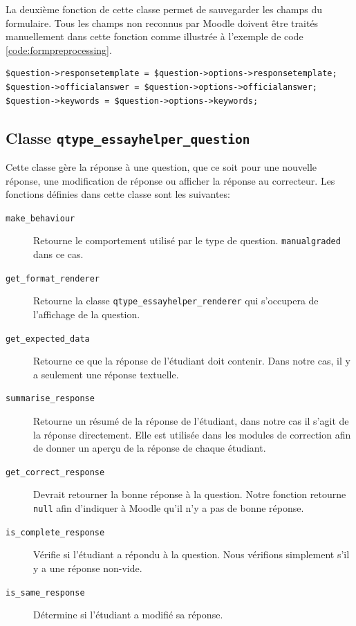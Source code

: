 La deuxi\`eme fonction de cette classe permet de sauvegarder les champs du formulaire.
Tous les champs non reconnus par Moodle doivent \^etre trait\'es manuellement dans cette fonction comme illustr\'ee \`a l'exemple de code \ref{code:formpreprocessing}.
\begin{lstfloat}
\begin{lstlisting}[frame=l]
$question->responsetemplate = $question->options->responsetemplate;
$question->officialanswer = $question->options->officialanswer;
$question->keywords = $question->options->keywords;
\end{lstlisting}
\caption{Extrait du code de la fonction \texttt{data\_preprocessing} de la classe \texttt{qtype\_essayhelper\_edit\_form}.}
\label{code:formpreprocessing}
\end{lstfloat}

\subsection*{Classe \texttt{qtype\_essayhelper\_question}}
Cette classe g\`ere la r\'eponse \`a une question, que ce soit pour une nouvelle r\'eponse, une modification de r\'eponse ou afficher la r\'eponse au correcteur.
Les fonctions d\'efinies dans cette classe sont les suivantes:
\begin{description}
  \item[\texttt{make\_behaviour}] Retourne le comportement utilis\'e par le type de question. \texttt{manualgraded} dans ce cas.
  \item[\texttt{get\_format\_renderer}] Retourne la classe \texttt{qtype\_essayhelper\_renderer} qui s'occupera de l'affichage de la question.
  \item[\texttt{get\_expected\_data}] Retourne ce que la r\'eponse de l'\'etudiant doit contenir. Dans notre cas, il y a seulement une r\'eponse textuelle.
  \item[\texttt{summarise\_response}] Retourne un r\'esum\'e de la r\'eponse de l'\'etudiant, dans notre cas il s'agit de la r\'eponse directement. Elle est utilis\'ee dans les modules de correction afin de donner un aper\c{c}u de la r\'eponse de chaque \'etudiant.
  \item[\texttt{get\_correct\_response}] Devrait retourner la bonne r\'eponse \`a la question. Notre fonction retourne \texttt{null} afin d'indiquer \`a Moodle qu'il n'y a pas de bonne r\'eponse.
  \item[\texttt{is\_complete\_response}] V\'erifie si l'\'etudiant a r\'epondu \`a la question. Nous v\'erifions simplement s'il y a une r\'eponse non-vide.
  \item[\texttt{is\_same\_response}] D\'etermine si l'\'etudiant a modifi\'e sa r\'eponse.
\end{description}

